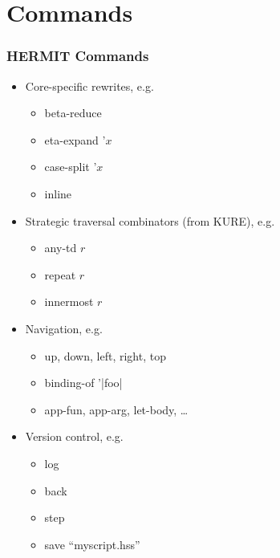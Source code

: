 \section{Commands}

\begin{frame}
\frametitle{HERMIT Commands}

\vspace{-1ex}

\begin{itemize}
\item
Core-specific rewrites, e.g.
\begin{itemize}
\item beta-reduce
\item eta-expand '$x$
\item case-split '$x$
\item inline
\end{itemize}

\item
Strategic traversal combinators (from KURE), e.g.
\begin{itemize}
\item any-td $r$
\item repeat $r$
\item innermost $r$
\end{itemize}


\item
Navigation, e.g.
\begin{itemize}
\item up, down, left, right, top
\item binding-of '|foo|
\item app-fun, app-arg, let-body, \ldots
\end{itemize}

\item
Version control, e.g.
\begin{itemize}
\item log
\item back
\item step
\item save ``myscript.hss''
\end{itemize}

\end{itemize}

\end{frame}
